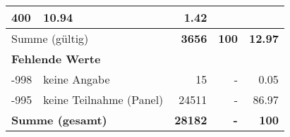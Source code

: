 \begin{longtable}{lXrrr}
       \num{400} &
       \num[round-mode=places,round-precision=2]{10.94} &
         \num[round-mode=places,round-precision=2]{1.42} \\
     \midrule
     \multicolumn{2}{l}{Summe (gültig)} &
       \textbf{\num{3656}} &
     \textbf{100} &
       \textbf{\num[round-mode=places,round-precision=2]{12.97}} \\
     \multicolumn{5}{l}{\textbf{Fehlende Werte}}\\
       -998 &
       keine Angabe &
         \num{15} &
        - &
         \num[round-mode=places,round-precision=2]{0.05} \\
       -995 &
       keine Teilnahme (Panel) &
         \num{24511} &
        - &
         \num[round-mode=places,round-precision=2]{86.97} \\
     \midrule
     \multicolumn{2}{l}{\textbf{Summe (gesamt)}} &
          \textbf{\num{28182}} &
        \textbf{-} &
        \textbf{100} \\
     \bottomrule
     \end{longtable}
     
